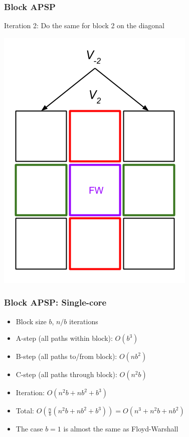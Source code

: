 \documentclass{beamer}
\begin{document}
\begin{frame}
\frametitle{Block APSP}
Iteration 2: Do the same for block 2 on the diagonal
\begin{center}
\includegraphics[scale = 0.4]{blockApsp-5.png}
\end{center}
\end{frame}

\begin{frame}
\frametitle{Block APSP: Single-core}
\begin{itemize}
\item Block size $b$, $n/b$ iterations 
\item A-step (all paths within block): $O(b^3)$
\item B-step (all paths to/from block): $O(nb^2)$
\item C-step (all paths through block): $O(n^2b)$
\item Iteration: $O(n^2 b + nb^2 + b^3)$
\item Total: $O(\frac{n}{b} (n^2 b + nb^2 + b^3)) = O(n^3 + n^2 b + nb^2)$
\item The case $b = 1$ is almost the same as Floyd-Warshall
\end{itemize}
\end{frame}
\end{document}
